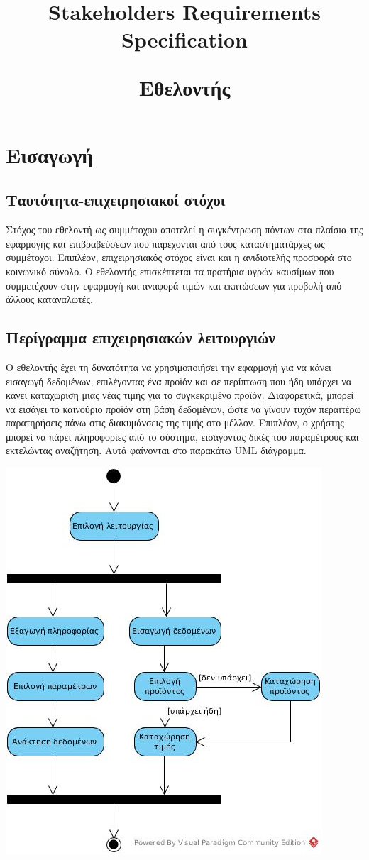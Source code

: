 \documentclass[a4paper,oneside, 12pt]{article}
\title{Stakeholders Requirements Specification\\
\begin{flushleft}
	Εθελοντής
\end{flushleft}}
\date{\vspace{-5ex}}
\begin{document}
\maketitle
\section{Εισαγωγή}
\subsection{Ταυτότητα-επιχειρησιακοί στόχοι}

Στόχος του εθελοντή ως συμμέτοχου αποτελεί η συγκέντρωση πόντων στα πλαίσια της εφαρμογής και επιβραβεύσεων που παρέχονται από τους καταστηματάρχες ως συμμέτοχοι. Επιπλέον, επιχειρησιακός στόχος είναι και η ανιδιοτελής προσφορά στο κοινωνικό σύνολο. Ο εθελοντής επισκέπτεται τα πρατήρια υγρών καυσίμων που συμμετέχουν στην εφαρμογή και αναφορά τιμών και εκπτώσεων για προβολή από άλλους καταναλωτές.

\subsection{Περίγραμμα επιχειρησιακών λειτουργιών}

Ο εθελοντής έχει τη δυνατότητα να χρησιμοποιήσει την εφαρμογή για να κάνει εισαγωγή δεδομένων, επιλέγοντας ένα προϊόν και σε περίπτωση που ήδη υπάρχει να κάνει καταχώριση μιας νέας τιμής για το συγκεκριμένο προϊόν. Διαφορετικά, μπορεί να εισάγει το καινούριο προϊόν στη βάση δεδομένων, ώστε να γίνουν τυχόν περαιτέρω παρατηρήσεις πάνω στις διακυμάνσεις της τιμής στο μέλλον. Επιπλέον, ο χρήστης μπορεί να πάρει πληροφορίες από το σύστημα, εισάγοντας δικές του παραμέτρους και εκτελώντας αναζήτηση. Αυτά φαίνονται στο παρακάτω UML διάγραμμα.

\includegraphics[scale=0.6]{UML-01}
\end{document}
